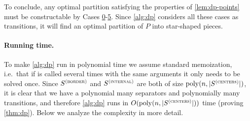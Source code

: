 \documentclass{theoretics}
\newcommand\Scen{S^{\textsc{(centers)}}}
\newcommand\Sint{S^{\textsc{(internal)}}}
\newcommand\Sbor{S^{\textsc{(border)}}}
\newcommand\poly{\mathrm{poly}}
\begin{document}
To conclude, any optimal partition satisfying the properties of \cref{lem:dp-points} must be constructable by Cases \hyperref[itm:case0]{0}-\hyperref[itm:case5]{5}. Since \cref{alg:dp} considers all these cases as transitions, it will find an optimal partition of $P$ into star-shaped pieces.

\paragraph{Running time.}
To make \cref{alg:dp} run in polynomial time we assume standard memoization, i.e.\ that if \FMain is called several times with the same arguments it only needs to be solved once. Since $\Sbor$ and $\Sint$ are both of size $\poly(n,|\Scen|)$, it is clear that we have a polynomial many separators and polynomially many transitions, and therefore \cref{alg:dp} runs in $O(\poly(n,|\Scen|))$ time (proving \cref{thm:dp}). Below we analyze the complexity in more detail. 
\end{document}
